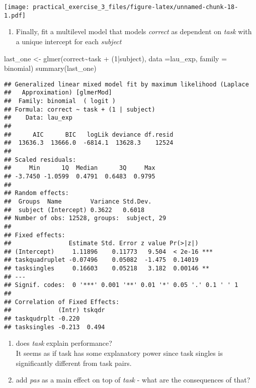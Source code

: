 \documentclass[
]{article}
\newenvironment{Shaded}{\begin{snugshade}}{\end{snugshade}}
\newcommand{\AttributeTok}[1]{\textcolor[rgb]{0.77,0.63,0.00}{#1}}
\newcommand{\DecValTok}[1]{\textcolor[rgb]{0.00,0.00,0.81}{#1}}
\newcommand{\FunctionTok}[1]{\textcolor[rgb]{0.00,0.00,0.00}{#1}}
\newcommand{\NormalTok}[1]{#1}
\newcommand{\OtherTok}[1]{\textcolor[rgb]{0.56,0.35,0.01}{#1}}
\newcommand{\SpecialCharTok}[1]{\textcolor[rgb]{0.00,0.00,0.00}{#1}}
\newcommand{\StringTok}[1]{\textcolor[rgb]{0.31,0.60,0.02}{#1}}
\providecommand{\tightlist}{%
  \setlength{\itemsep}{0pt}\setlength{\parskip}{0pt}}
\begin{document}
\texttt{[image: practical\_exercise\_3\_files/figure-latex/unnamed-chunk-18-1.pdf]}

\begin{enumerate}
\def\labelenumi{\arabic{enumi})}
\setcounter{enumi}{2}
\tightlist
\item
  Finally, fit a multilevel model that models \emph{correct} as
  dependent on \emph{task} with a unique intercept for each
  \emph{subject}
\end{enumerate}

\begin{Shaded}
\begin{Highlighting}[]
\NormalTok{last\_one }\OtherTok{\textless{}{-}} \FunctionTok{glmer}\NormalTok{(correct}\SpecialCharTok{\textasciitilde{}}\NormalTok{task }\SpecialCharTok{+}\NormalTok{ (}\DecValTok{1}\SpecialCharTok{|}\NormalTok{subject), }\AttributeTok{data =}\NormalTok{lau\_exp, }\AttributeTok{family =} \StringTok{\textquotesingle{}binomial\textquotesingle{}}\NormalTok{)}
\FunctionTok{summary}\NormalTok{(last\_one)}
\end{Highlighting}
\end{Shaded}

\begin{verbatim}
## Generalized linear mixed model fit by maximum likelihood (Laplace
##   Approximation) [glmerMod]
##  Family: binomial  ( logit )
## Formula: correct ~ task + (1 | subject)
##    Data: lau_exp
## 
##      AIC      BIC   logLik deviance df.resid 
##  13636.3  13666.0  -6814.1  13628.3    12524 
## 
## Scaled residuals: 
##     Min      1Q  Median      3Q     Max 
## -3.7450 -1.0599  0.4791  0.6483  0.9795 
## 
## Random effects:
##  Groups  Name        Variance Std.Dev.
##  subject (Intercept) 0.3622   0.6018  
## Number of obs: 12528, groups:  subject, 29
## 
## Fixed effects:
##                Estimate Std. Error z value Pr(>|z|)    
## (Intercept)     1.11896    0.11773   9.504  < 2e-16 ***
## taskquadruplet -0.07496    0.05082  -1.475  0.14019    
## tasksingles     0.16603    0.05218   3.182  0.00146 ** 
## ---
## Signif. codes:  0 '***' 0.001 '**' 0.01 '*' 0.05 '.' 0.1 ' ' 1
## 
## Correlation of Fixed Effects:
##             (Intr) tskqdr
## taskqudrplt -0.220       
## tasksingles -0.213  0.494
\end{verbatim}

\begin{enumerate}
\def\labelenumi{\roman{enumi}.}
\item
  does \emph{task} explain performance?\\
  It seems as if task has some explanatory power since task singles is
  significantly different from task pairs.
\item
  add \emph{pas} as a main effect on top of \emph{task} - what are the
  consequences of that?
\end{enumerate}
\end{document}
